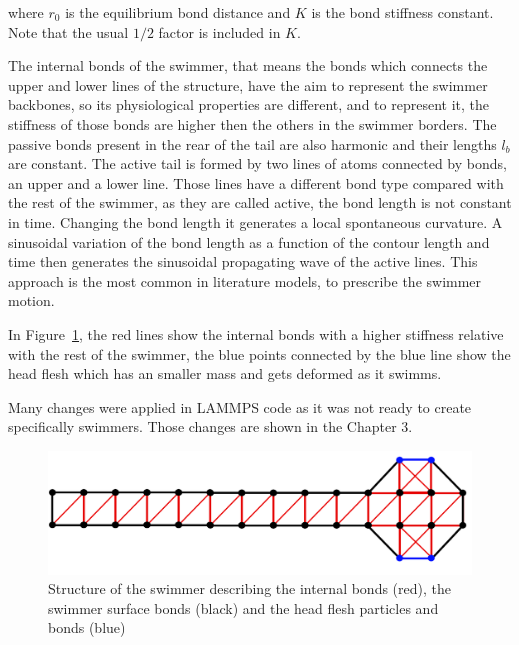 where $r_{0}$ is the equilibrium bond distance and $K$ is the bond stiffness constant. Note that the usual $1/2$ factor is included in $K$.

The internal bonds of the swimmer, that means the bonds which connects the upper and lower lines of the structure, have the aim to represent the swimmer backbones, so its 
physiological properties are different, and to represent it, the stiffness of those bonds are higher then the others in the swimmer borders. The passive bonds present in the 
rear of the tail are also harmonic and their lengths $l_{b}$ are constant. The active tail is formed by two lines of atoms connected by bonds, an upper and a lower line. Those
lines have a different bond type compared with the rest of the swimmer, as they are called active, the bond length is not constant in time. Changing the bond length it generates
a local spontaneous curvature. A sinusoidal variation of the bond length as a function of the contour length and time then generates the sinusoidal propagating wave of the active
lines. This approach is the most common in literature models, to prescribe the swimmer motion.\par

In Figure~\ref{fig:Bild2.7}, the red lines show the internal bonds with a higher stiffness relative with the rest of the swimmer, the blue points connected by the blue line show the 
head flesh which has an smaller mass and gets deformed as it swimms.\par
Many changes were applied in LAMMPS code as it was not ready to create specifically swimmers. Those changes are shown in the Chapter 3.


\begin{figure}[ht]
\centering
  \begin{footnotesize}
  \includegraphics[scale=0.25]{images/swimmer-compare.png}
  \caption[Structure of the swimmer describing the internal bonds (red), the swimmer surface bonds (black) and the head flesh particles and bonds(blue)]{Structure of the swimmer describing the internal bonds (red), the swimmer surface bonds (black) and the head flesh particles and bonds (blue)}
  \label{fig:Bild2.7}
  \end{footnotesize}
\end{figure} 










